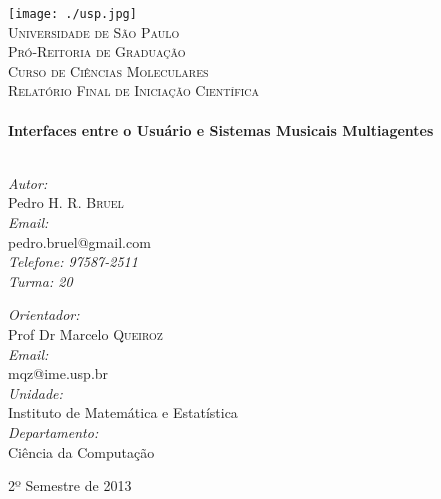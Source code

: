 \begin{titlepage}

\begin{center}

\texttt{[image: ./usp.jpg]}\\[1 cm]

\textsc{\LARGE Universidade de São Paulo}\\
\textsc{\Large Pró-Reitoria de Graduação}\\
\textsc{\Large Curso de Ciências Moleculares}\\[1.5cm]
\textsc{\Large Relatório Final de Iniciação Científica}\\[0.5cm]

\HRule \\[0.4cm]
{ \LARGE \bfseries Interfaces entre o Usuário e Sistemas Musicais Multiagentes}\\[0.4cm]

\HRule \\[1.5cm]

\begin{minipage}{0.4\textwidth}
\begin{flushleft} \normalsize
\emph{Autor:}\\
Pedro H. R. \textsc{Bruel} \\
\vspace{0.3cm}
\emph{Email:}\\
pedro.bruel@gmail.com \\
\vspace{0.3cm}
\emph{Telefone: 97587-2511}\\
\vspace{0.3cm}
\emph{Turma: 20}\\
\end{flushleft}
\end{minipage}
\begin{minipage}{0.5\textwidth}
\begin{flushright} \normalsize
\emph{Orientador:} \\
Prof Dr Marcelo \textsc{Queiroz} \\
\vspace{0.3cm}
\emph{Email:}\\
mqz@ime.usp.br \\
\vspace{0.3cm}
\emph{Unidade: }\\
Instituto de Matemática e Estatística \\
\vspace{0.3cm}
\emph{Departamento: }\\
Ciência da Computação\\
\end{flushright}
\end{minipage}
\vfill
{\large 2º Semestre de 2013}

\end{center}

\end{titlepage}
